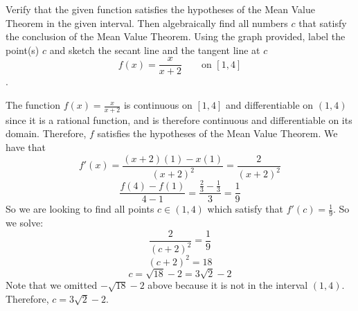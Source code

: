 \documentclass[nooutcomes]{ximera}
\begin{document}
\begin{problem}
Verify that the given function satisfies the hypotheses of the Mean Value Theorem in the given interval.  Then algebraically find all numbers $c$ that satisfy the conclusion of the Mean Value Theorem.  Using the graph provided, label the point(s) $c$ and sketch the secant line and the tangent line at $c$
$$ f(x) = \frac{x}{x+2} \qquad \text{on } [1,4] $$.
		\begin{freeResponse}
		The function $f(x) = \frac{x}{x+2}$ is continuous on $[1,4]$ and differentiable on $(1,4)$ since it is a rational function, and is therefore continuous and differentiable on its domain.  Therefore, $f$ satisfies the hypotheses of the Mean Value Theorem.  We have that
		$$ f'(x) = \frac{(x+2)(1) - x(1)}{(x+2)^2} = \frac{2}{(x+2)^2} $$
		$$ \frac{f(4) - f(1)}{4-1} = \frac{\frac{2}{3} - \frac{1}{3}}{3} = \frac{1}{9} $$
		So we are looking to find all points $c \in (1,4)$ which satisfy that $ f'(c) = \frac{1}{9} $.  So we solve:
		$$ \frac{2}{(c+2)^2} = \frac{1}{9} $$
		$$ (c+2)^2 = 18 $$
		$$ c = \sqrt{18} - 2 = 3\sqrt{2} - 2 $$
		Note that we omitted $-\sqrt{18} - 2$ above because it is not in the interval $(1,4)$.  Therefore, $c = 3\sqrt{2} - 2$.
		
		\end{freeResponse}
		
		
\end{problem}
















\begin{problem}

		\begin{freeResponse}
		
		\end{freeResponse}
		
		
		

\end{problem}
	
	
	
\end{document}

